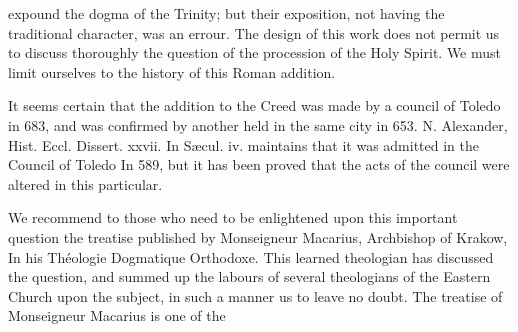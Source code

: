 expound the dogma of the Trinity; but their exposition, not having the traditional character, was an errour. The design of this work does not permit us to discuss thoroughly the question of the procession of the Holy Spirit. We must limit ourselves to the history of this Roman addition.

It seems certain that the addition to the Creed was made by a council of Toledo in 683, and was confirmed by another held in the same city in 653. N. Alexander, Hist. Eccl. Dissert. xxvii. In Sæcul. iv. maintains that it was admitted in the Council of Toledo In 589, but it has been proved that the acts of the council were altered in this particular.

We recommend to those who need to be enlightened upon this important question the treatise published by Monseigneur Macarius, Archbishop of Krakow, In his Théologie Dogmatique Orthodoxe. This learned theologian has discussed the question, and summed up the labours of several theologians of the Eastern Church upon the subject, in such a manner us to leave no doubt. The treatise of Monseigneur Macarius is one of the

